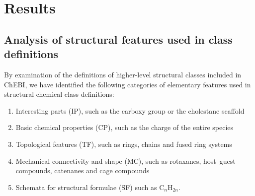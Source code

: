 \documentclass[10pt]{bmc_article}
\newenvironment{bmcformat}{\baselineskip20pt\sloppy\setboolean{publ}{false}}{\baselineskip20pt\sloppy}
\begin{document}
\begin{bmcformat}

\section*{Results}

\subsection*{Analysis of structural features used in class definitions}
\label{sec:resultsclasses}



By examination of the definitions of higher-level structural classes included in ChEBI, we have identified the following categories of elementary features used in structural chemical class definitions: 
\begin{enumerate}
	\item	Interesting parts (IP), such as the carboxy group or the cholestane scaffold
	\item	Basic chemical properties (CP), such as the charge of the entire species
	\item	Topological features (TF), such as rings, chains and fused ring systems
	\item Mechanical connectivity and shape (MC), such as rotaxanes, host--guest compounds, catenanes and cage compounds
	\item	Schemata for structural formulae (SF) such as C$_n$H$_{2n}$.
\end{enumerate}


\end{bmcformat}
\end{document}

